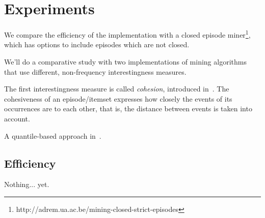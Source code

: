 \chapter{Experiments}

We compare the efficiency of the implementation with a closed episode miner\footnote{http://adrem.ua.ac.be/mining-closed-strict-episodes}, which has options to include episodes which are not closed.

We'll do a comparative study with two implementations of mining algorithms that use different, non-frequency interestingness measures.

The first interestingness measure is called \emph{cohesion}, introduced in~\citep{cule2016efficient}. The cohesiveness of an episode/itemset expresses how closely the events of its occurrences are to each other, that is, the distance between events is taken into account.

A quantile-based approach in~\citep{feremans2018mining}.

\section{Efficiency}

Nothing... yet.
